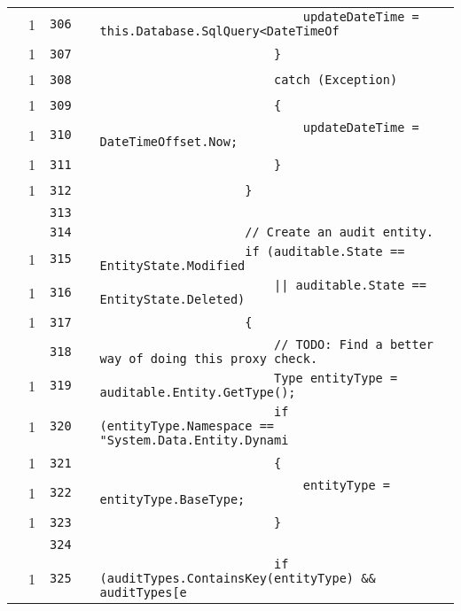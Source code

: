 \documentclass[a4paper,10pt]{article}
\begin{document}
\begin{longtable}[l]{lrrll}
\cellcolor{green} & 1 & \verb~306~ & & \verb~                            updateDateTime = this.Database.SqlQuery<DateTimeOf~\\
\cellcolor{green} & 1 & \verb~307~ & & \verb~                        }~\\
\cellcolor{green} & 1 & \verb~308~ & & \verb~                        catch (Exception)~\\
\cellcolor{green} & 1 & \verb~309~ & & \verb~                        {~\\
\cellcolor{green} & 1 & \verb~310~ & & \verb~                            updateDateTime = DateTimeOffset.Now;~\\
\cellcolor{green} & 1 & \verb~311~ & & \verb~                        }~\\
\cellcolor{green} & 1 & \verb~312~ & & \verb~                    }~\\
\cellcolor{gray} &  & \verb~313~ & & \verb~~\\
\cellcolor{gray} &  & \verb~314~ & & \verb~                    // Create an audit entity.~\\
\cellcolor{green} & 1 & \verb~315~ & & \verb~                    if (auditable.State == EntityState.Modified~\\
\cellcolor{green} & 1 & \verb~316~ & & \verb~                        || auditable.State == EntityState.Deleted)~\\
\cellcolor{green} & 1 & \verb~317~ & & \verb~                    {~\\
\cellcolor{gray} &  & \verb~318~ & & \verb~                        // TODO: Find a better way of doing this proxy check.~\\
\cellcolor{green} & 1 & \verb~319~ & & \verb~                        Type entityType = auditable.Entity.GetType();~\\
\cellcolor{green} & 1 & \verb~320~ & & \verb~                        if (entityType.Namespace == "System.Data.Entity.Dynami~\\
\cellcolor{green} & 1 & \verb~321~ & & \verb~                        {~\\
\cellcolor{green} & 1 & \verb~322~ & & \verb~                            entityType = entityType.BaseType;~\\
\cellcolor{green} & 1 & \verb~323~ & & \verb~                        }~\\
\cellcolor{gray} &  & \verb~324~ & & \verb~~\\
\cellcolor{green} & 1 & \verb~325~ & & \verb~                        if (auditTypes.ContainsKey(entityType) && auditTypes[e~\\

\end{longtable}
\end{document}
